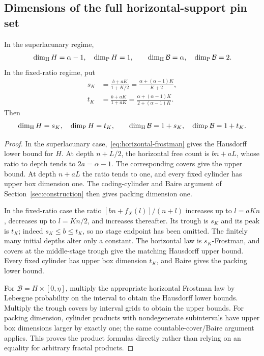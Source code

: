\subsection{Dimensions of the full horizontal-support pin set}
\begin{proposition}\label{prop:B-dimensions}
In the superlacunary regime,
\begin{equation}\label{eq:B-super-dim}
 \dim_{\mathrm H} H=\alpha-1,\quad\dim_{\mathrm P} H=1,\qquad
 \dim_{\mathrm H}\mathcal B=\alpha,\quad\dim_{\mathrm P}\mathcal B=2.
\end{equation}
In the fixed-ratio regime, put
\begin{align}
 s_K&=\frac{b+aK}{1+K/2}
     =\frac{\alpha+(\alpha-1)K}{K+2},\label{eq:sK}\\
 t_K&=\frac{b+aK}{1+aK}
     =\frac{\alpha+(\alpha-1)K}{2+(\alpha-1)K}.\label{eq:tK}
\end{align}
Then
\begin{equation}\label{eq:B-fixed-dim}
 \dim_{\mathrm H} H=s_K,\quad\dim_{\mathrm P} H=t_K,\qquad
 \dim_{\mathrm H}\mathcal B=1+s_K,\quad\dim_{\mathrm P}\mathcal B=1+t_K.
\end{equation}
\end{proposition}
\begin{proof}
In the superlacunary case,~\eqref{eq:horizontal-frostman} gives the
Hausdorff lower bound for $H$. At depth $n+L/2$, the horizontal free
count is $bn+aL$, whose ratio to depth tends to $2a=\alpha-1$.
The corresponding covers give the upper bound. At depth $n+aL$ the
ratio tends to one, and every fixed cylinder has upper box dimension one.
The coding-cylinder and Baire argument of Section~\ref{sec:construction}
then gives packing dimension one.

In the fixed-ratio case the ratio
$[bn+f_X(l)]/(n+l)$ increases up to $l=aKn$, decreases up to $l=Kn/2$,
and increases thereafter. Its trough is $s_K$ and its peak is $t_K$;
indeed $s_K\leq b\leq t_K$, so no stage endpoint has been omitted.
The finitely many initial depths alter only a constant. The horizontal
law is $s_K$-Frostman, and covers at the middle-stage trough give the
matching Hausdorff upper bound. Every fixed cylinder has upper box
dimension $t_K$, and Baire gives the packing lower bound.

For $\mathcal B=H\times[0,\eta]$, multiply the appropriate horizontal
Frostman law by Lebesgue probability on the interval to obtain the
Hausdorff lower bounds. Multiply the trough covers by interval grids to
obtain the upper bounds. For packing dimension, cylinder products with
nondegenerate subintervals have upper box dimensions larger by exactly one;
the same countable-cover/Baire argument applies. This proves the product
formulas directly rather than relying on an equality for arbitrary
fractal products.
\end{proof}
